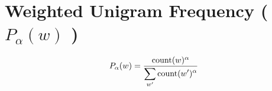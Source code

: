 \section{Weighted Unigram Frequency ( $P_\alpha(w)$ )}\label{Weighted Unigram Frequency (p alpha)}

\[
    P_\alpha(w) = \dfrac{\operatorname{count}(w)^\alpha}{\displaystyle\sum_{w'} \operatorname{count}(w')^\alpha}
\]










































































